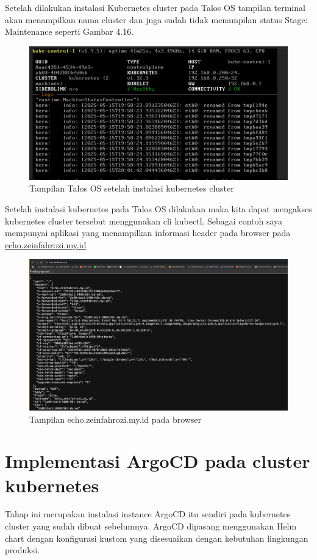 \newpage
Setelah dilakukan instalasi Kubernetes cluster pada Talos OS tampilan terminal akan menampilkan nama cluster
dan juga sudah tidak menampilan status Stage: Maintenance seperti Gambar 4.16.
\begin{figure}[!ht]
    \centering
    \includegraphics[width=1\textwidth]{figures/talos-install-11.jpg}
    \caption{Tampilan Talos OS setelah instalasi kubernetes cluster}
\end{figure}
\newpage
Setelah instalasi kubernetes pada Talos OS dilakukan maka kita dapat mengakses kubernetes cluster tersebut menggunakan cli kubectl.
Sebagai contoh saya mempunyai aplikasi yang menampilkan informasi header pada browser pada \url{echo.zeinfahrozi.my.id}
\begin{figure}[!ht]
    \centering
    \includegraphics[width=1\textwidth]{figures/echo-web.jpg}
    \caption{Tampilan echo.zeinfahrozi.my.id pada browser}
\end{figure}
\section{Implementasi ArgoCD pada cluster kubernetes}
Tahap ini merupakan instalasi instance ArgoCD itu sendiri pada kubernetes cluster yang sudah dibuat sebelumnya. ArgoCD dipasang menggunakan Helm chart dengan konfigurasi kustom yang disesuaikan dengan kebutuhan lingkungan produksi.

